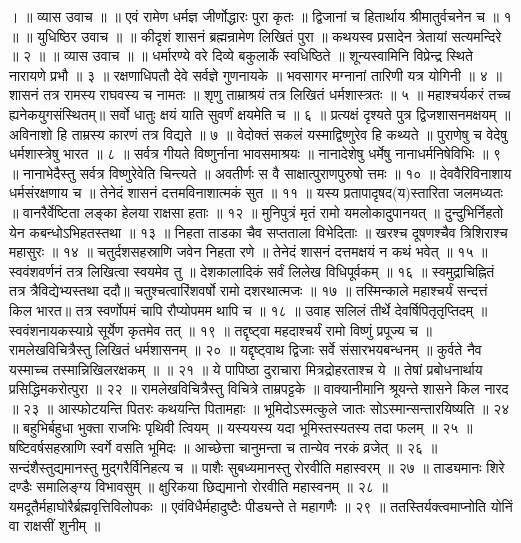 । ॥ व्यास उवाच ॥ ॥
एवं रामेण धर्मज्ञ जीर्णोद्धारः पुरा कृतः ॥
द्विजानां च हितार्थाय श्रीमातुर्वचनेन च ॥ १ ॥
॥ युधिष्ठिर उवाच ॥ ॥
कीदृशं शासनं ब्रह्मन्रामेण लिखितं पुरा ॥
कथयस्व प्रसादेन त्रेतायां सत्यमन्दिरे ॥ २ ॥
॥ व्यास उवाच ॥ ॥
धर्मारण्ये वरे दिव्ये बकुलार्के स्वधिष्ठिते ॥
शून्यस्वामिनि विप्रेन्द्र स्थिते नारायणे प्रभौ ॥ ३ ॥
रक्षणाधिपतौ देवे सर्वज्ञे गुणनायके ॥
भवसागर मग्नानां तारिणी यत्र योगिनी ॥ ४ ॥
शासनं तत्र रामस्य राघवस्य च नामतः ॥
शृणु ताम्राश्रयं तत्र लिखितं धर्मशास्त्रतः ॥ ५ ॥
महाश्चर्यकरं तच्च ह्यनेकयुगसंस्थितम्॥
सर्वो धातुः क्षयं याति सुवर्णं क्षयमेति च ॥ ६ ॥
प्रत्यक्षं दृश्यते पुत्र द्विजशासनमक्षयम् ॥
अविनाशो हि ताम्रस्य कारणं तत्र विद्यते ॥ ७ ॥
वेदोक्तं सकलं यस्माद्विष्णुरेव हि कथ्यते ॥
पुराणेषु च वेदेषु धर्मशास्त्रेषु भारत ॥ ८ ॥
सर्वत्र गीयते विष्णुर्नाना भावसमाश्रयः ॥
नानादेशेषु धर्मेषु नानाधर्मनिषेविभिः ॥ ९ ॥
नानाभेदैस्तु सर्वत्र विष्णुरेवेति चिन्त्यते ॥
अवतीर्णः स वै साक्षात्पुराणपुरुषो त्तमः ॥ १० ॥
देववैरिविनाशाय धर्मसंरक्षणाय च ॥
तेनेदं शासनं दत्तमविनाशात्मकं सुत ॥ ११ ॥
यस्य प्रतापादृषद(य)स्तारिता जलमध्यतः ॥
वानरैर्वेष्टिता लङ्का हेलया राक्षसा हताः ॥ १२ ॥
मुनिपुत्रं मृतं रामो यमलोकादुपानयत् ॥
दुन्दुभिर्निहतो येन कबन्धोऽभिहतस्तथा ॥ १३ ॥
निहता ताडका चैव सप्तताला विभेदिताः ॥
खरश्च दूषणश्चैव त्रिशिराश्च महासुरः ॥ १४ ॥
चतुर्दशसहस्राणि जवेन निहता रणे ॥
तेनेदं शासनं दत्तमक्षयं न कथं भवेत् ॥ १५ ॥
स्ववंशवर्णनं तत्र लिखित्वा स्वयमेव तु ॥
देशकालादिकं सर्वं लिलेख विधिपूर्वकम् ॥ १६ ॥
स्वमुद्राचिह्नितं तत्र त्रैविद्येभ्यस्तथा ददौ॥
चतुश्चत्वारिंशवर्षो रामो दशरथात्मजः ॥ १७ ॥
तस्मिन्काले महाश्चर्यं सन्दत्तं किल भारत॥
तत्र स्वर्णोपमं चापि रौप्योपमम थापि च ॥ १८ ॥
उवाह सलिलं तीर्थे देवर्षिपितृतृप्तिदम् ॥
स्ववंशनायकस्याग्रे सूर्येण कृतमेव तत् ॥ १९ ॥
तद्दृष्ट्वा महदाश्चर्यं रामो विष्णुं प्रपूज्य च ॥
रामलेखविचित्रैस्तु लिखितं धर्मशासनम् ॥ २० ॥
यद्दृष्ट्वाथ द्विजाः सर्वे संसारभयबन्धनम् ॥
कुर्वते नैव यस्माच्च तस्मान्निखिलरक्षकम् ॥ ॥ २१ ॥
ये पापिष्ठा दुराचारा मित्रद्रोहरताश्च ये ॥
तेषां प्रबोधनार्थाय प्रसिद्धिमकरोत्पुरा ॥ २२ ॥
रामलेखविचित्रैस्तु विचित्रे ताम्रपट्टके ॥
वाक्यानीमानि श्रूयन्ते शासने किल नारद ॥ २३ ॥
आस्फोटयन्ति पितरः कथयन्ति पितामहाः ॥
भूमिदोऽस्मत्कुले जातः सोऽस्मान्सन्तारयिष्यति ॥ २४ ॥
बहुभिर्बहुधा भुक्ता राजभिः पृथिवी त्वियम् ॥
यस्ययस्य यदा भूमिस्तस्यतस्य तदा फलम् ॥ २५ ॥
षष्टिवर्षसहस्राणि स्वर्गे वसति भूमिदः ॥
आच्छेत्ता चानुमन्ता च तान्येव नरकं व्रजेत् ॥ २६ ॥
सन्दंशैस्तुद्यमानस्तु मुद्गरैर्विनिहत्य च ॥
पाशैः सुबध्यमानस्तु रोरवीति महास्वरम् ॥ २७ ॥
ताड्यमानः शिरे दण्डैः समालिङ्ग्य विभावसुम् ॥
क्षुरिकया छिद्यमानो रोरवीति महास्वनम् ॥ २८ ॥
यमदूतैर्महाघोरैर्ब्रह्मवृत्तिविलोपकः ॥
एवंविधैर्महादुष्टैः पीड्यन्ते ते महागणैः ॥ २९ ॥
ततस्तिर्यक्त्वमाप्नोति योनिं वा राक्षसीं शुनीम् ॥
